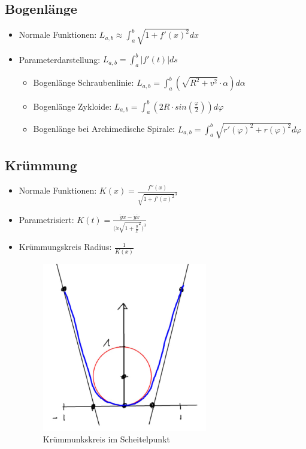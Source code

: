 \subsection{Bogenlänge}
\begin{itemize}
	\item Normale Funktionen: $L_{a,b} \approx \int_a^b \sqrt{1+f'(x)^2} dx$
	\item Parameterdarstellung:
	$L_{a,b} = \int_a^b |f'(t)| ds$
	\begin{itemize}
		\item Bogenlänge Schraubenlinie:
		$L_{a,b} = \int_a^b (\sqrt{R^2 + v^2}\cdot \alpha ) d\alpha$
		\item Bogenlänge Zykloide:
		$L_{a,b} = \int_a^b (2 R\cdot sin(\frac{\varphi}{2})) d\varphi$
		\item Bogenlänge bei Archimedische Spirale:
		$L_{a,b} = \int_a^b \sqrt{r'(\varphi)^2 + r(\varphi)^2} d\varphi$
	\end{itemize}
\end{itemize}

\subsection{Krümmung}
\begin{itemize}
	\item Normale Funktionen: $K(x) = \frac{f''(x)}{\sqrt{1+f'(x)^2}^3}$
	\item Parametrisiert:
	$K(t) = \frac
		{\ddot{y} \dot{x} - \dot{y} \ddot{x}}
		{\big ( \dot{x} \sqrt{1 + \frac{ \dot{y} }{ \dot{x} }^2} \big )^3}
	$
	\item Krümmungskreis Radius: $\frac{1}{K(x)}$ \\
	\begin{figure}[h!]
		\centering
		\includegraphics[scale=.5]{pics/kruemmungskreis}
		\caption{Krümmunkskreis im Scheitelpunkt}
	\end{figure}
\end{itemize}

